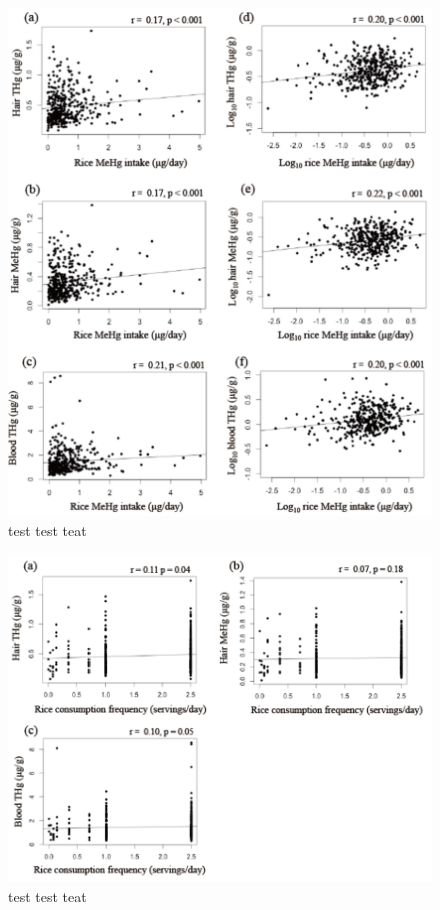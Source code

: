 \begin{figure}
  \centering
    \label{fig:Fig210}
  \includegraphics[scale=1]{Figures/Fig210.pdf}
  \caption[test caption]{test test teat}
\end{figure}

\begin{figure}
  \centering
    \label{fig:Fig211}
  \includegraphics[scale=1]{Figures/Fig211.pdf}
  \caption[test caption]{test test teat}
\end{figure}

